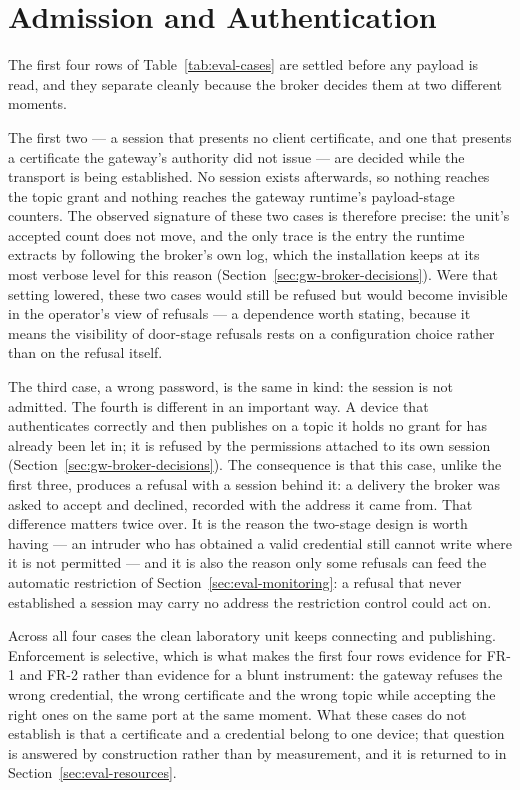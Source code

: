 \documentclass[12pt,a4paper]{report}
\begin{document}
\section{Admission and Authentication}
\label{sec:eval-admission}

The first four rows of Table~\ref{tab:eval-cases} are
settled before any payload is read, and they separate
cleanly because the broker decides them at two different
moments.

The first two --- a session that presents no client
certificate, and one that presents a certificate the
gateway's authority did not issue --- are decided while the
transport is being established. No session exists
afterwards, so nothing reaches the topic grant and nothing
reaches the gateway runtime's payload-stage counters. The
observed signature of these two cases is therefore precise:
the unit's accepted count does not move, and the only trace
is the entry the runtime extracts by following the broker's
own log, which the installation keeps at its most verbose
level for this reason (Section~\ref{sec:gw-broker-decisions}).
Were that setting lowered, these two cases would still be
refused but would become invisible in the operator's view of
refusals --- a dependence worth stating, because it means the
visibility of door-stage refusals rests on a configuration
choice rather than on the refusal itself.

The third case, a wrong password, is the same in kind: the
session is not admitted. The fourth is different in an
important way. A device that authenticates correctly and
then publishes on a topic it holds no grant for has already
been let in; it is refused by the permissions attached to
its own session (Section~\ref{sec:gw-broker-decisions}). The
consequence is that this case, unlike the first three,
produces a refusal with a session behind it: a delivery the
broker was asked to accept and declined, recorded with the
address it came from. That difference matters twice over. It
is the reason the two-stage design is worth having --- an
intruder who has obtained a valid credential still cannot
write where it is not permitted --- and it is also the
reason only some refusals can feed the automatic
restriction of Section~\ref{sec:eval-monitoring}: a refusal
that never established a session may carry no address the
restriction control could act on.

Across all four cases the clean laboratory unit keeps
connecting and publishing. Enforcement is selective, which
is what makes the first four rows evidence for FR-1 and
FR-2 rather than evidence for a blunt instrument: the
gateway refuses the wrong credential, the wrong certificate
and the wrong topic while accepting the right ones on the
same port at the same moment. What these cases do not
establish is that a certificate and a credential belong to
one device; that question is answered by construction rather
than by measurement, and it is returned to in
Section~\ref{sec:eval-resources}.
\end{document}
